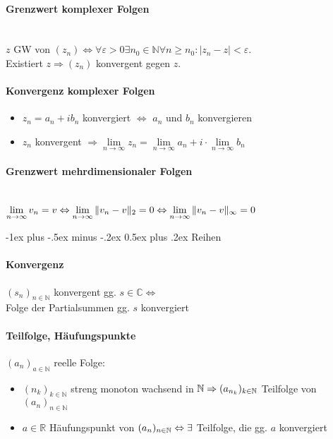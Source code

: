 \documentclass[paper=a3,paper=landscape, fontsize=9pt,DIV=30]{scrartcl}
\makeatletter
\newcommand{\real}{{\mathbb{R}}}
\newcommand{\compl}{\mathbb{C}}
\newcommand{\nat}{\mathbb{N}}
\newcommand{\aseq}{(a_n)_{n \in \nat}}
\newcommand{\srow}{(s_n)_{n \in \nat}}
\renewcommand{\section}{\@startsection{section}{1}{0mm}%
  {-1ex plus -.5ex minus -.2ex}%
  {0.5ex plus .2ex}%
  {\color{blue}\normalfont\large\bfseries}}
\makeatother
\begin{document}
\begin{multicols*}{4}
\paragraph{Grenzwert komplexer Folgen}\hspace{0pt} \\
$z$ GW von $(z_n) \Leftrightarrow \forall \varepsilon > 0 \exists n_0 \in \nat \forall n \geq n_0: |z_n - z| < \varepsilon$.\\Existiert $z \Rightarrow (z_n)$ konvergent gegen $z$.


\paragraph{Konvergenz komplexer Folgen}
\begin{itemize}
	\item $z_n = a_n + ib_n$ konvergiert $\Leftrightarrow$ $a_n$ und $b_n$ konvergieren
	\item $z_n$ konvergent $\Rightarrow \lim\limits_{n \rightarrow \infty} z_n = \lim\limits_{n \rightarrow \infty} a_n + i \cdot \lim\limits_{n \rightarrow \infty} b_n$
\end{itemize}


\paragraph{Grenzwert mehrdimensionaler Folgen}\hspace{0pt} \\
$\lim\limits_{n \rightarrow \infty} v_n = v \Leftrightarrow \lim\limits_{n \rightarrow \infty} \Arrowvert v_n - v\Arrowvert_2 = 0 \Leftrightarrow \lim\limits_{n \rightarrow \infty} \Arrowvert v_n - v\Arrowvert_\infty = 0 $

  \section{Reihen}

  \paragraph{Konvergenz}
  $\srow$ konvergent gg. $s \in \compl \Leftrightarrow$\\Folge der Partialsummen gg. $s$ konvergiert

  \paragraph{Teilfolge, Häufungspunkte}
  $(a_n)_{a \in \nat}$ reelle Folge:
  \begin{itemize}
  	\item $(n_k)_{k \in \nat}$ streng monoton wachsend in $\nat \\\Rightarrow (a_{n_k})_{k \in \nat}$ Teilfolge von $\aseq$
  	\item $a \in \real$ Häufungspunkt von $\aseq \Leftrightarrow\\\exists$ Teilfolge, die gg. $a$ konvergiert
  \end{itemize}


\end{multicols*}
\end{document}
